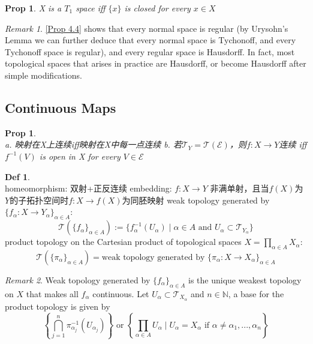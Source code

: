 \documentclass[hidelinks]{article}
\theoremstyle{definition}
\newtheorem*{defin}{Def}
\theoremstyle{plain}
\newtheorem{proposition}[theorem]{Prop}
\theoremstyle{remark}
\newtheorem*{remark}{Remark}
\begin{document}
\begin{proposition} \label{Prop 4.4}
X is a $T_1$ space iff $\{x\}$ is closed for every $x\in X$
\end{proposition}

\begin{remark}
\autoref{Prop 4.4} shows that every normal space is regular (by Urysohn's Lemma we can further deduce that every normal space is Tychonoff, and every Tychonoff space is regular), and every regular space is Hausdorff. In fact, most topological spaces that arises in practice are Hausdorff, or become Hausdorff after simple modifications.
\end{remark}



\subsection{Continuous Maps}
\begin{proposition}~\\
a. 映射在X上连续iff映射在X中每一点连续 \newline
b. 若$\mathscr{T}_Y=\mathscr{T}(\mathscr{E})$，则$f:X\to Y$连续 iff $f^{-1}(V)$ is open in X for every $V\in \mathscr{E}$
\end{proposition}

\begin{defin}~\\
homeomorphism: 双射+正反连续 \newline
embedding: $f:X\to Y$ 非满单射，且当$f(X)$为$Y$的子拓扑空间时$f:X\to f(X)$为同胚映射 \newline
weak topology generated by $\{f_\alpha:X\to Y_\alpha\}_{\alpha \in A}$:
\[
\mathscr{T}(\{f_\alpha\}_{\alpha \in A}):=\{f^{-1}_\alpha(U_\alpha)\mid \alpha \in A \textrm{ and } U_\alpha \subset \mathscr{T}_{Y_\alpha}\}
\]
product topology on the Cartesian product of topological spaces $X=\prod_{\alpha \in A}X_\alpha$:
\[ \mathscr{T}(\{\pi_\alpha\}_{\alpha \in A})=\textrm{weak topology generated by }\{\pi_\alpha:X \to X_\alpha\}_{\alpha \in A}
\]
\end{defin}

\begin{remark}
Weak topology generated by $\{f_\alpha\}_{\alpha \in A}$ is the unique weakest topology on $X$ that makes all $f_\alpha$ continuous. Let $U_\alpha \subset \mathscr{T}_{X_\alpha}$ and $n\in \mathbb{N}$, a base for the product topology is given by
\[
\left\{\bigcap_{j=1}^{n}\pi^{-1}_{\alpha_j}(U_{\alpha_j})\right\} \textrm{ or } \left\{\prod_{\alpha \in A}U_\alpha \mid U_\alpha=X_\alpha \textrm{ if } \alpha \neq \alpha_1,...,\alpha_n\right\} 
\]
\end{remark}
\end{document}

